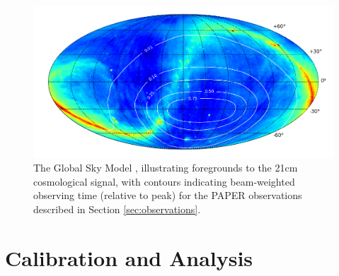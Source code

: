 \documentclass[twocolumn,numberedappendix]{emulateapj} \shorttitle{PSA64}
\begin{document}
\begin{figure}[!t]\centering
\includegraphics[width=2\columnwidth,height=\columnwidth]{plots/coverage.png}
\caption{The Global Sky Model \citep{deoliveira2008}, illustrating foregrounds to the 21cm
cosmological signal, with 
contours indicating beam-weighted observing time (relative to peak) for the PAPER observations
described in Section \ref{sec:observations}.
}\label{fig:coverage}
\end{figure}


\section{Calibration and Analysis}\label{sec:analysis}
\end{document}
